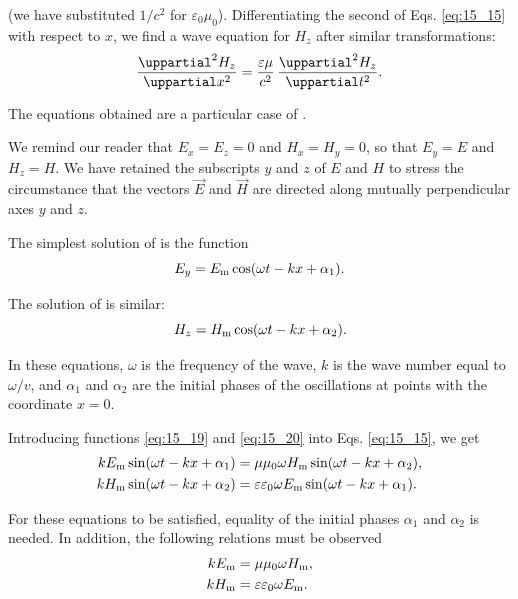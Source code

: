 \noindent
(we have substituted $1/c^2$ for $\varepsilon_0 \mu_0$).
Differentiating the second of Eqs. \eqref{eq:15_15} with respect to $x$, we find a wave equation for $H_z$ after similar transformations:
\begin{equation}\label{eq:15_18}
    \diffnpartial{H_z}{x}{2} = \frac{\varepsilon\mu}{c^2}\, \diffnpartial{H_z}{t}{2}.
\end{equation}

\noindent
The equations obtained are a particular case of .

We remind our reader that $E_x=E_z=0$ and $H_x=H_y=0$, so that $E_y=E$ and $H_z=H$.
We have retained the subscripts $y$ and $z$ of $E$ and $H$ to stress the circumstance that the vectors $\vec{E}$ and $\vec{H}$ are directed along mutually perpendicular axes $y$ and $z$.

The simplest solution of  is the function
\begin{equation}\label{eq:15_19}
    E_y = E_{\text{m}} \cos(\omega t - kx + \alpha_1).
\end{equation}

\noindent
The solution of  is similar:
\begin{equation}\label{eq:15_20}
    H_z = H_{\text{m}} \cos(\omega t - kx + \alpha_2).
\end{equation}

\noindent
In these equations, $\omega$ is the frequency of the wave, $k$ is the wave number equal to $\omega/v$, and $\alpha_1$ and $\alpha_2$ are the initial phases of the oscillations at points with the coordinate $x=0$.

Introducing functions \eqref{eq:15_19} and \eqref{eq:15_20} into Eqs. \eqref{eq:15_15}, we get
\begin{align*}
    kE_{\text{m}} \sin(\omega t - kx + \alpha_1) &= \mu\mu_0 \omega H_{\text{m}} \sin(\omega t - kx + \alpha_2),\\
    kH_{\text{m}} \sin(\omega t - kx + \alpha_2) &= \varepsilon\varepsilon_0 \omega E_{\text{m}} \sin(\omega t - kx + \alpha_1).
\end{align*}

\noindent
For these equations to be satisfied, equality of the initial phases $\alpha_1$ and $\alpha_2$ is needed.
In addition, the following relations must be observed
\begin{align*}
    kE_{\text{m}} &= \mu\mu_0 \omega H_{\text{m}},\\
    kH_{\text{m}} &= \varepsilon\varepsilon_0 \omega E_{\text{m}}.
\end{align*}

